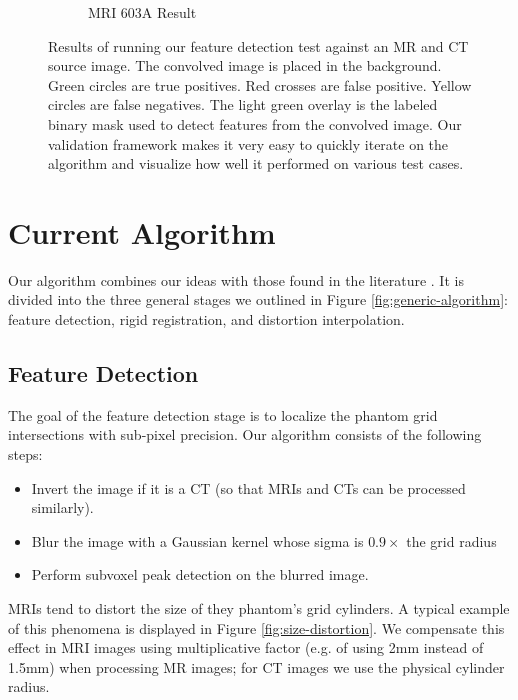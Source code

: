 \documentclass[12pt]{article}
\begin{document}
\begin{figure}
\begin{subfigure}[b]{0.48\textwidth}
        \caption{MRI 603A Result}
        \label{fig:testing-feature-detection_2}
    \end{subfigure}
    \caption{Results of running our feature detection test against an MR and CT source image.  The convolved image is placed in the background.  Green circles are true positives.  Red crosses are false positive.  Yellow circles are false negatives.  The light green overlay is the labeled binary mask used to detect features from the convolved image.  Our validation framework makes it very easy to quickly iterate on the algorithm and visualize how well it performed on various test cases.}
    \label{fig:feature-detection-run}
\end{figure}

\section{Current Algorithm}

Our algorithm combines our ideas with those found in the literature \cite{stanescu2010,baldwin2007}.  It is divided into the three general stages we outlined in Figure \ref{fig:generic-algorithm}: feature detection, rigid registration, and distortion interpolation.

\subsection{Feature Detection}

The goal of the feature detection stage is to localize the phantom grid intersections with sub-pixel precision.  Our algorithm consists of the following steps:

\begin{itemize}
    \item Invert the image if it is a CT (so that MRIs and CTs can be processed similarly).
    \item Blur the image with a Gaussian kernel whose sigma is $0.9 \times$ the grid radius
    \item Perform subvoxel peak detection on the blurred image.
\end{itemize}

MRIs tend to distort the size of they phantom's grid cylinders.  A typical example of this phenomena is displayed in Figure \ref{fig:size-distortion}.  We compensate this effect in MRI images using multiplicative factor (e.g. of using 2mm instead of 1.5mm) when processing MR images; for CT images we use the physical cylinder radius.
\end{document}

